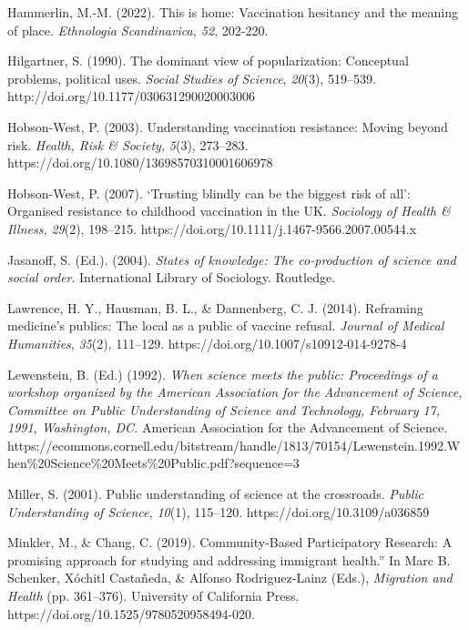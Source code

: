 \documentclass[authordate, empirical]{jote-new-article}
\begin{document}
	Hammerlin, M.-M. (2022). This is home: Vaccination hesitancy and the meaning of place. \emph{Ethnologia Scandinavica, 52}, 202-220.



	Hilgartner, S. (1990). The dominant view of popularization: Conceptual problems, political uses. \emph{Social Studies of Science}, \emph{20}(3), 519--539. http://doi.org/10.1177/030631290020003006



	Hobson-West, P. (2003). Understanding vaccination resistance: Moving beyond risk. \emph{Health, Risk \& Society,} \emph{5}(3), 273--283. https://doi.org/10.1080/13698570310001606978



	Hobson-West, P. (2007). ‘Trusting blindly can be the biggest risk of all': Organised resistance to childhood vaccination in the UK. \emph{Sociology of Health \& Illness,} \emph{29}(2), 198--215. https://doi.org/10.1111/j.1467-9566.2007.00544.x



	Jasanoff, S. (Ed.). (2004). \emph{States of knowledge: The co-production of science and social order}. International Library of Sociology. Routledge.



	Lawrence, H. Y., Hausman, B. L., \& Dannenberg, C. J. (2014). Reframing medicine's publics: The local as a public of vaccine refusal. \emph{Journal of Medical Humanities}, \emph{35}(2), 111--129. https://doi.org/10.1007/s10912-014-9278-4



	Lewenstein, B. (Ed.) (1992). \emph{When science meets the public: Proceedings of a workshop organized by the American Association for the Advancement of Science, Committee on Public Understanding of Science and Technology, February 17, 1991, Washington, DC. }American Association for the Advancement of Science. https://ecommons.cornell.edu/bitstream/handle/1813/70154/Lewenstein.1992.When\%20Science\%20Meets\%20Public.pdf?sequence=3



	Miller, S. (2001). Public understanding of science at the crossroads. \emph{Public Understanding of Science,} \emph{10}(1), 115--120. https://doi.org/10.3109/a036859



	Minkler, M., \& Chang, C. (2019). Community-Based Participatory Research: A promising approach for studying and addressing immigrant health.” In Marc B. Schenker, Xóchitl Castañeda, \& Alfonso Rodriguez-Lainz (Eds.), \emph{Migration and Health }(pp. 361--376). University of California Press. https://doi.org/10.1525/9780520958494-020.
\end{document}
